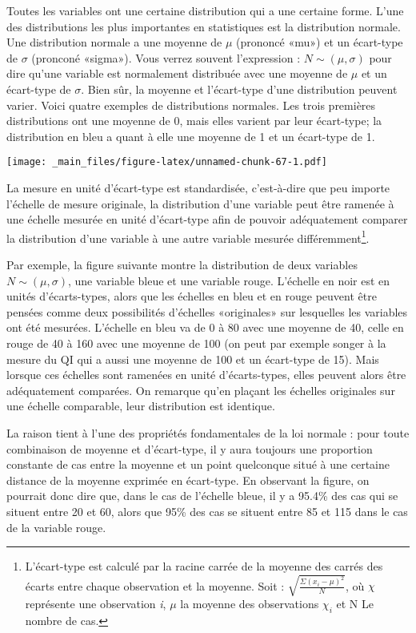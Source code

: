 \documentclass[
]{book}
\begin{document}
Toutes les variables ont une certaine distribution qui a une certaine forme. L'une des distributions les plus importantes en statistiques est la distribution normale. Une distribution normale a une moyenne de \(\mu\) (prononcé «mu») et un écart-type de \(\sigma\) (pronconé «sigma»). Vous verrez souvent l'expression : \(N\sim(\mu, \sigma)\) pour dire qu'une variable est normalement distribuée avec une moyenne de \(\mu\) et un écart-type de \(\sigma\). Bien sûr, la moyenne et l'écart-type d'une distribution peuvent varier. Voici quatre exemples de distributions normales. Les trois premières distributions ont une moyenne de 0, mais elles varient par leur écart-type; la distribution en bleu a quant à elle une moyenne de 1 et un écart-type de 1.

\texttt{[image: \_main\_files/figure-latex/unnamed-chunk-67-1.pdf]}

La mesure en unité d'écart-type est standardisée, c'est-à-dire que peu importe l'échelle de mesure originale, la distribution d'une variable peut être ramenée à une échelle mesurée en unité d'écart-type afin de pouvoir adéquatement comparer la distribution d'une variable à une autre variable mesurée différemment\footnote{L'écart-type est calculé par la racine carrée de la moyenne des carrés des écarts entre chaque observation et la moyenne. Soit : \(\sqrt{\frac{\Sigma({x}_{i}-\mu)^2}{N}}\), où \(\chi\) représente une observation \emph{i}, \(\mu\) la moyenne des observations \(\chi_i\) et N Le nombre de cas.}.

Par exemple, la figure suivante montre la distribution de deux variables \(N\sim(\mu, \sigma)\), une variable bleue et une variable rouge. L'échelle en noir est en unités d'écarts-types, alors que les échelles en bleu et en rouge peuvent être pensées comme deux possibilités d'échelles «originales» sur lesquelles les variables ont été mesurées. L'échelle en bleu va de 0 à 80 avec une moyenne de 40, celle en rouge de 40 à 160 avec une moyenne de 100 (on peut par exemple songer à la mesure du QI qui a aussi une moyenne de 100 et un écart-type de 15). Mais lorsque ces échelles sont ramenées en unité d'écarts-types, elles peuvent alors être adéquatement comparées. On remarque qu'en plaçant les échelles originales sur une échelle comparable, leur distribution est identique.

La raison tient à l'une des propriétés fondamentales de la loi normale : pour toute combinaison de moyenne et d'écart-type, il y aura toujours une proportion constante de cas entre la moyenne et un point quelconque situé à une certaine distance de la moyenne exprimée en écart-type. En observant la figure, on pourrait donc dire que, dans le cas de l'échelle bleue, il y a 95.4\% des cas qui se situent entre 20 et 60, alors que 95\% des cas se situent entre 85 et 115 dans le cas de la variable rouge.
\end{document}

